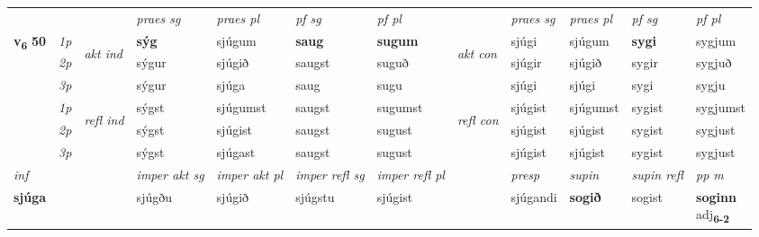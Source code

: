 \begin{longtable}[l]{X>{\footnotesize\itshape}llXXXXlXXXX}
 & &   & \textit{praes sg}  & \textit{praes pl}    & \textit{ pf sg} & \textit{pf pl} & & \textit{praes sg}  & \textit{praes pl}    & \textit{pf sg} & \textit{pf pl }  \\ \cmidrule{4-7} \cmidrule{9-12}
 \multirow{2}{*}{{{\textbf{v{\textsubscript{6}}} \Large{\textbf{50}}}}}  & 1p & \multirow{3}{*}{\begin{turn}{90}\textit{akt ind}\end{turn}} & \textbf{sýg} & sjúgum & \textbf{saug} & \textbf{sugum} & \multirow{3}{*}{\begin{turn}{90}\textit{akt con}\end{turn}} &sjúgi & sjúgum & \textbf{sygi} & sygjum\\*
 & 2p &  &  sýgur  & sjúgið & saugst & suguð & & sjúgir & sjúgið & sygir & sygjuð \\*
 & 3p &  & sýgur & sjúga & saug & sugu & & sjúgi & sjúgi& sygi & sygju \\*
\cmidrule{4-7} \cmidrule{9-12}
 & 1p & \multirow{3}{*}{\begin{turn}{90}\textit{refl ind}\end{turn}}  & sýgst & sjúgumst & saugst & sugumst & \multirow{3}{*}{\begin{turn}{90}\textit{refl con}\end{turn}}  &sjúgist & sjúgumst & sygist & sygjumst \\*
 & 2p &  & sýgst & sjúgist & saugst & sugust & &sjúgist & sjúgist & sygist & sygjust \\*
 & 3p  & & sýgst & sjúgast & saugst & sugust & & sjúgist & sjúgist& sygist & sygjust \\*
\cmidrule{4-7} \cmidrule{9-12}

   {\textit{inf}} & &  & \textit{imper akt sg} & \textit{imper akt pl} & \textit{imper refl sg} & \textit{imper refl pl} && \textit{presp} & \textit{supin} & \textit{supin refl} & \textit{pp m} \\*
  {\textbf{sjúga}} & && sjúgðu  & sjúgið & sjúgstu & sjúgist && sjúgandi &  \textbf{sogið} & sogist & \specialcell{\textbf{soginn} \\ adj\textbf{\textsubscript{6-2}}} \\*

\midrule


\end{longtable}
